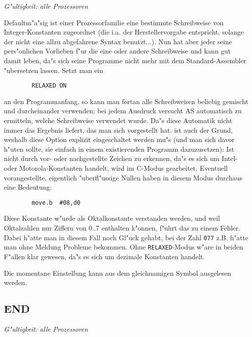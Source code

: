 \documentclass[12pt,a4paper,twoside]{report}
\makeatletter
\newcommand{\tty}[1]{{\tt #1}}
\newcommand{\ttindex}[1]{\index{#1@{\tt #1}}}
\makeatother
\begin{document}
{\em G"ultigkeit: alle Prozessoren}

Defaultm"a"sig ist einer Prozessorfamilie eine bestimmte Schreibweise
von Integer-Konstanten zugeordnet (die i.a. der Herstellervorgabe
entspricht, solange der nicht eine allzu abgefahrene Syntax benutzt...).
Nun hat aber jeder seine pers"onlichen Vorlieben f"ur die eine oder
andere Schreibweise und kann gut damit leben, da"s sich seine Programme
nicht mehr mit dem Standard-Assembler "ubersetzen lassen. Setzt man ein
\begin{verbatim}
        RELAXED ON
\end{verbatim}
an den Programmanfang, so kann man fortan alle Schreibweisen beliebig
gemischt und durcheinander verwenden; bei jedem Ausdruck versucht AS
automatisch zu ermitteln, welche Schreibweise verwendet wurde.  Da"s
diese Automatik nicht immer das Ergebnis liefert, das man sich vorgestellt
hat, ist auch der Grund, weshalb diese Option explizit eingeschaltet
werden mu"s (und man sich davor h"uten sollte, sie einfach in einem
existierenden Programm dazuzusetzen): Ist nicht durch vor- oder
nachgestellte Zeichen zu erkennen, da"s es sich um Intel- oder
Motorola-Konstanten handelt, wird im C-Modus gearbeitet.  Eventuell
vorangestellte, eigentlich "uberfl"ussige Nullen haben in diesem Modus
durchaus eine Bedeutung:
\begin{verbatim}
        move.b  #08,d0
\end{verbatim}
Diese Konstante w"urde als Oktalkonstante verstanden werden, und weil
Oktalzahlen nur Ziffern von 0..7 enthalten k"onnen, f"uhrt das zu einem
Fehler.  Dabei h"atte man in diesem Fall noch Gl"uck gehabt, bei der
Zahl \tty{077} z.B. h"atte man ohne Meldung Probleme bekommen.  Ohne
\tty{RELAXED}-Modus w"are in beiden F"allen klar gewesen, da"s es sich
um dezimale Konstanten handelt.
\par
Die momentane Einstellung kann aus dem gleichnamigen Symbol ausgelesen
werden.


\subsection{END}
\ttindex{END}

{\em G"ultigkeit: alle Prozessoren}
\end{document}
